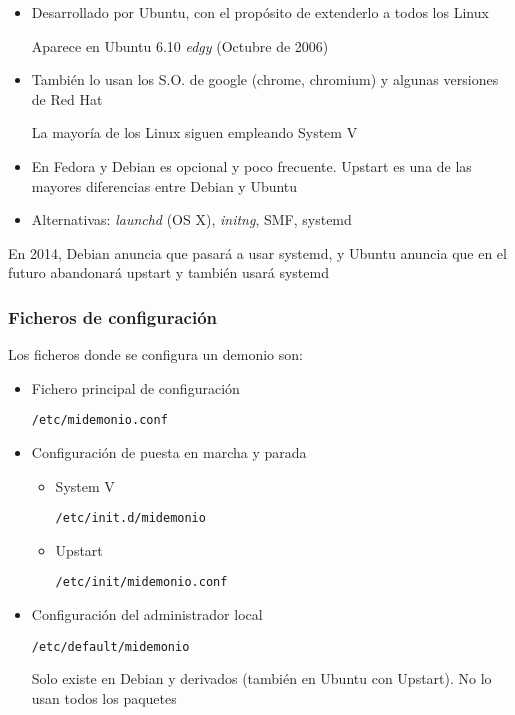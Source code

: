 \documentclass[ucs]{beamer}
\begin{document}
\begin{frame}[fragile]

\begin{itemize}

\item
Desarrollado por Ubuntu, con el propósito de extenderlo
a todos los Linux

Aparece en Ubuntu 6.10 \emph{edgy} (Octubre de 2006)
\item
También lo usan los S.O. de google (chrome, chromium) y algunas versiones
de Red Hat

La mayoría de los Linux siguen empleando System V
\item
En Fedora y Debian es opcional y poco frecuente. Upstart es
una de las mayores diferencias entre Debian y Ubuntu

\item
Alternativas: \emph{launchd} (OS X), \emph{initng},  SMF, systemd 

\end{itemize}
En 2014, Debian anuncia que pasará a usar systemd, y Ubuntu anuncia que en el futuro abandonará upstart y también usará systemd


\end{frame}

\begin{frame}[fragile]
\frametitle{Ficheros de configuración}
Los ficheros donde se configura un demonio son:
\begin{itemize}
\item
Fichero principal de configuración 

\verb|/etc/midemonio.conf|

\item
Configuración de puesta en marcha y parada 


\begin{itemize}
\item
System V

\verb|/etc/init.d/midemonio|
\item
Upstart

\verb|/etc/init/midemonio.conf|

\end{itemize}


\item
Configuración del administrador local

\verb|/etc/default/midemonio|

Solo existe en Debian y
derivados (también en Ubuntu con Upstart). No lo usan todos los
paquetes

\end{itemize}
\end{frame}
\end{document}
